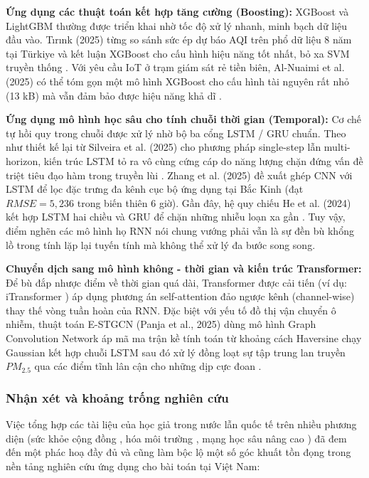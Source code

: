 \textbf{Ứng dụng các thuật toán kết hợp tăng cường (Boosting):} XGBoost và LightGBM thường được triển khai nhờ tốc độ xử lý nhanh, minh bạch dữ liệu đầu vào. Tırınk (2025) từng so sánh sức ép dự báo AQI trên phổ dữ liệu 8 năm tại Türkiye và kết luận XGBoost cho cấu hình hiệu năng tốt nhất, bỏ xa SVM truyền thống \cite{tirink2025aqi}. Với yêu cầu IoT ở trạm giám sát rẻ tiền biên, Al-Nuaimi et al. (2025) có thể tóm gọn một mô hình XGBoost cho cấu hình tài nguyên rất nhỏ (13 kB) mà vẫn đảm bảo được hiệu năng khả dĩ \cite{alnuaimi2025lightweight}.

\textbf{Ứng dụng mô hình học sâu cho tính chuỗi thời gian (Temporal):} Cơ chế tự hồi quy trong chuỗi được xử lý nhờ bộ ba cổng LSTM / GRU chuẩn. Theo như thiết kế lại từ Silveira et al. (2025) cho phương pháp single-step lẫn multi-horizon, kiến trúc LSTM tỏ ra vô cùng cứng cáp do năng lượng chặn đứng vấn đề triệt tiêu đạo hàm trong truyền lùi \cite{silveira2025lstmgru}. Zhang et al. (2025) \cite{zhang2025cnnlstm} đề xuất ghép CNN với LSTM để lọc đặc trưng đa kênh cục bộ ứng dụng tại Bắc Kinh (đạt $RMSE = 5{,}236$ trong biến thiên 6 giờ). Gần đây, hệ quy chiếu He et al. (2024) kết hợp LSTM hai chiều và GRU để chặn những nhiễu loạn xa gần \cite{he2024bilstmgru}. Tuy vậy, điểm nghẽn các mô hình họ RNN nói chung vướng phải vẫn là sự đền bù khổng lồ trong tính lặp lại tuyến tính mà không thể xử lý đa bước song song.

\textbf{Chuyển dịch sang mô hình không - thời gian và kiến trúc Transformer:} Để bù đắp nhược điểm về thời gian quá dài, Transformer được cải tiến (ví dụ: iTransformer \cite{liu2024itransformer}) áp dụng phương án self-attention đảo ngược kênh (channel-wise) thay thế vòng tuần hoàn của RNN. Đặc biệt với yếu tố đồ thị vận chuyển ô nhiễm, thuật toán E-STGCN (Panja et al., 2025) dùng mô hình Graph Convolution Network áp mã ma trận kề tính toán từ khoảng cách Haversine chạy Gaussian kết hợp chuỗi LSTM sau đó xử lý đồng loạt sự tập trung lan truyền $PM_{2.5}$ qua các điểm tĩnh lân cận cho những dịp cực đoan \cite{panja2025estgcn}. 

\subsubsection{Nhận xét và khoảng trống nghiên cứu}

Việc tổng hợp các tài liệu của học giả trong nước lẫn quốc tế trên nhiều phương diện (sức khỏe cộng đồng \cite{hoang2023health}, hóa môi trường \cite{ho2025assessment}, mạng học sâu nâng cao \cite{liu2024itransformer}) đã đem đến một phác hoạ đầy đủ và cũng làm bộc lộ một số góc khuất tồn đọng trong nền tảng nghiên cứu ứng dụng cho bài toán tại Việt Nam:

